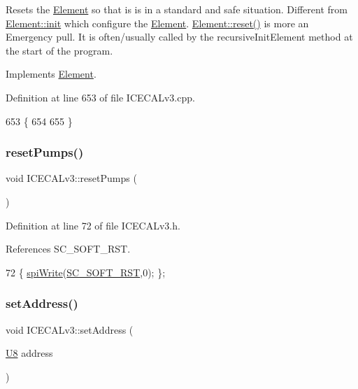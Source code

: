 Resets the \hyperlink{classElement}{Element} so that is is in a standard and safe situation. Different from \hyperlink{classElement_af42754b5cabc198869222725218d695c}{Element\+::init} which configure the \hyperlink{classElement}{Element}. \hyperlink{classElement_a69efffa22f06909d768149715565cb56}{Element\+::reset()} is more an Emergency pull. It is often/usually called by the recursive\+Init\+Element method at the start of the program. 

Implements \hyperlink{classElement_a69efffa22f06909d768149715565cb56}{Element}.



Definition at line 653 of file I\+C\+E\+C\+A\+Lv3.\+cpp.


\begin{DoxyCode}
653                     \{
654 
655 \}
\end{DoxyCode}
\mbox{\label{classICECALv3_a1b9ca0e09d45634a70da6f19a7257314}} 
\subsubsection{\texorpdfstring{reset\+Pumps()}{resetPumps()}}
{\footnotesize\ttfamily void I\+C\+E\+C\+A\+Lv3\+::reset\+Pumps (\begin{DoxyParamCaption}{ }\end{DoxyParamCaption})\hspace{0.3cm}{\ttfamily [inline]}}



Definition at line 72 of file I\+C\+E\+C\+A\+Lv3.\+h.



References S\+C\+\_\+\+S\+O\+F\+T\+\_\+\+R\+ST.


\begin{DoxyCode}
72 \{                                       \hyperlink{classICECALv3_aef00f02801dea4bda2093c930501dcdd}{spiWrite}(\hyperlink{ICECALv3_8h_adfc33152f992de37ef835a719df6c934}{SC\_SOFT\_RST},0);                                 
      \};
\end{DoxyCode}
\mbox{\label{classICECALv3_aaf38119f47401a85022ae1b0d05675bd}} 
\subsubsection{\texorpdfstring{set\+Address()}{setAddress()}}
{\footnotesize\ttfamily void I\+C\+E\+C\+A\+Lv3\+::set\+Address (\begin{DoxyParamCaption}\item[{\hyperlink{ICECALv3_8h_a3cb25ca6f51f003950f9625ff05536fc}{U8}}]{address }\end{DoxyParamCaption})\hspace{0.3cm}{\ttfamily [inline]}}




